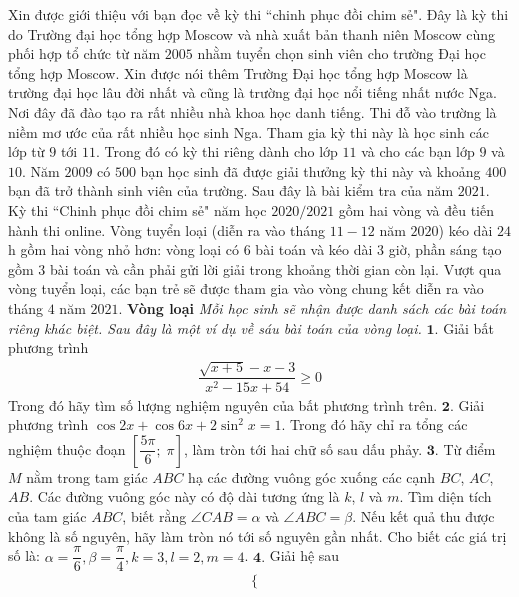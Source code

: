 \begin{multicols}{2}
	Xin được giới thiệu với bạn đọc về kỳ thi ``chinh phục đồi chim sẻ". Đây là kỳ thi do Trường đại học tổng hợp Moscow và nhà xuất bản thanh niên Moscow cùng phối hợp tổ chức từ năm $2005$ nhằm tuyển chọn sinh viên cho trường Đại học tổng hợp Moscow. Xin được nói thêm Trường Đại học tổng hợp Moscow là trường đại học lâu đời nhất và cũng là trường đại học nổi tiếng nhất nước Nga. Nơi đây đã đào tạo ra rất nhiều nhà khoa học danh tiếng. Thi đỗ vào trường là niềm mơ ước của rất nhiều học sinh Nga. Tham gia kỳ thi này là học sinh các lớp từ $9$ tới $11$. Trong đó có kỳ thi riêng dành cho lớp $11$ và cho các bạn lớp $9$ và $10$. Năm $2009$ có $500$ bạn học sinh đã được giải thưởng kỳ thi này và khoảng $400$ bạn đã trở thành sinh viên của trường. Sau đây là bài kiểm tra của năm $2021$.
	\vskip 0.1cm
	Kỳ thi ``Chinh phục đồi chim sẻ" năm học $2020/2021$ gồm hai vòng và đều tiến hành thi online. Vòng tuyển loại (diễn ra vào tháng $11-12$ năm $2020$) kéo dài $24$h gồm hai vòng nhỏ hơn: vòng loại có $6$ bài toán và kéo dài $3$ giờ, phần sáng tạo gồm $3$ bài toán và cần phải gửi lời giải trong khoảng thời gian còn lại. Vượt qua vòng tuyển loại, các bạn trẻ sẽ được tham gia vào vòng chung kết diễn ra vào tháng $4$ năm $2021$.
	\vskip 0.1cm
	\textbf{\color{cackithi}Vòng loại}
	\vskip 0.1cm
	\textit{Mỗi học sinh sẽ nhận được danh sách các bài toán riêng khác biệt. Sau đây là một ví dụ về sáu bài toán của vòng loại.}
	\vskip 0.1cm
	$\pmb{1.}$ Giải bất phương trình
	\begin{align*}
		\dfrac{{\sqrt {x + 5}  - x - 3}}{{{x^2} - 15x + 54}} \ge 0
	\end{align*}
	Trong đó hãy tìm số lượng nghiệm nguyên của bất phương trình trên.
	\vskip 0.1cm
	$\pmb{2.}$ Giải phương trình $\cos 2x + \cos 6x + 2\sin^2 x = 1$.
	\vskip 0.1cm
	Trong đó hãy chỉ ra tổng các nghiệm thuộc đoạn $\left[ {\dfrac{{5\pi }}{6};\;\pi } \right]$, làm tròn tới hai chữ số sau dấu phảy.
	\vskip 0.1cm
	$\pmb{3.}$ Từ điểm $M$ nằm trong tam giác $ABC$ hạ các đường vuông góc xuống các cạnh $BC$, $AC$, $AB$. Các đường vuông góc này có độ dài tương ứng là $k$, $l$ và $m$. Tìm diện tích của tam giác $ABC$, biết rằng $\angle CAB = \alpha$ và  $\angle ABC = \beta$. Nếu kết quả thu được không là số nguyên, hãy làm tròn nó tới số nguyên gần nhất.
	\vskip 0.1cm
	Cho biết các giá trị số là:  $\alpha = \dfrac{\pi}{6}, \beta = \dfrac{\pi}{4},k=3  ,l=2  ,m=4$.
	\vskip 0.1cm 
	$\pmb{4.}$ Giải hệ sau
	\begin{align*}
		\begin{cases}

\end{cases}
\end{align*}
\end{multicols}
